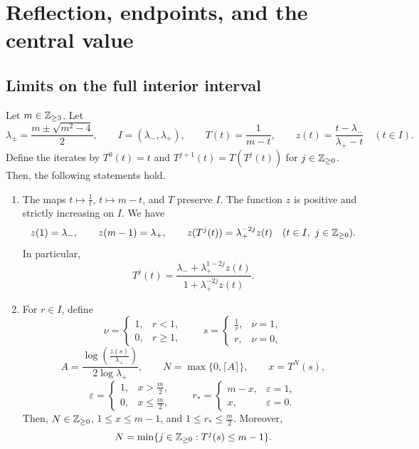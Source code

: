 \section{Reflection, endpoints, and the central value}\label{sec:endpoints}
\subsection{Limits on the full interior interval}\label{sec:interior-transport}
\begin{lemma}\label{lem:specified-reduction-word}
Let $m\in\mathbb Z_{\ge3}$. Let
\[
 \lambda_\pm=\frac{m\pm\sqrt{m^2-4}}2,\qquad
 I=(\lambda_-,\lambda_+),\qquad
 T(t)=\frac1{m-t},\qquad
 z(t)=\frac{t-\lambda_-}{\lambda_+-t}\quad(t\in I).
\]
Define the iterates by $T^0(t)=t$ and $T^{j+1}(t)=T(T^j(t))$ for $j\in\mathbb Z_{\ge0}$. Then, the following statements hold.

\begin{enumerate}
\item\label{c:reduction-cross-ratio} The maps $t\mapsto\frac1t$, $t\mapsto m-t$, and $T$ preserve $I$. The function $z$ is positive and strictly increasing on $I$. We have
\[
z(1)=\lambda_-,\qquad z(m-1)=\lambda_+,\qquad
z(T^j(t))=\lambda_+^{-2j}z(t)
\quad(t\in I,\ j\in\mathbb Z_{\ge0}).
\]
In particular,
\begin{equation}\label{eq:reduction-iterate}
T^j(t)=
\frac{\lambda_-+\lambda_+^{1-2j}z(t)}{1+\lambda_+^{-2j}z(t)}.
\end{equation}

\item\label{c:reduction-first-index} For $r\in I$, define
\[
\nu=\begin{cases}1,&r<1,\\0,&r\ge1,\end{cases}
\qquad
s=\begin{cases}\frac1r,&\nu=1,\\r,&\nu=0,\end{cases}
\]
\[
A=\frac{\log(\frac{z(s)}{\lambda_+})}{2\log\lambda_+},\qquad
N=\max\{0,\lceil A\rceil\},\qquad x=T^N(s),
\]
\[
\varepsilon=\begin{cases}1,&x>\frac m2,\\0,&x\le \frac m2,\end{cases}
\qquad
r_*=\begin{cases}m-x,&\varepsilon=1,\\x,&\varepsilon=0.\end{cases}
\]
Then, $N\in\mathbb Z_{\ge0}$, $1\le x\le m-1$, and $1\le r_*\le \frac m2$. Moreover,
\[
N=\min\{j\in\mathbb Z_{\ge0}:T^j(s)\le m-1\}.
\]


\end{enumerate}
\end{lemma}
